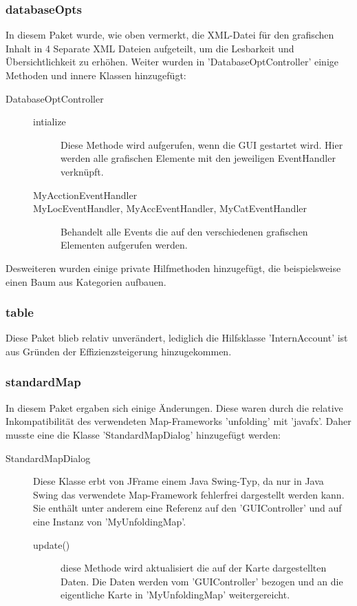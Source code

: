 		\subsubsection{databaseOpts}
		In diesem Paket wurde, wie oben vermerkt, die XML-Datei für den grafischen Inhalt in 4 Separate XML Dateien aufgeteilt, um die Lesbarkeit und Übersichtlichkeit zu erhöhen.
		Weiter wurden in 'DatabaseOptController' einige Methoden und innere Klassen hinzugefügt:
		\begin{description}
			\item[DatabaseOptController] \quad
			
			\begin{description}
				\item[intialize]
				 \quad
				Diese Methode wird aufgerufen, wenn die GUI gestartet wird. Hier werden alle grafischen Elemente mit den jeweiligen EventHandler verknüpft.
				\item[MyAcctionEventHandler]
				\item[MyLocEventHandler, MyAccEventHandler, MyCatEventHandler] 
				\quad
				Behandelt alle Events die auf den verschiedenen grafischen Elementen aufgerufen werden.
			\end{description}
		\end{description}
	
		Desweiteren wurden einige private Hilfmethoden hinzugefügt, die beispielsweise einen Baum aus Kategorien aufbauen.
		
		\subsubsection{table}
		
		Diese Paket blieb relativ unverändert, lediglich die Hilfsklasse 'InternAccount' ist aus Gründen der Effizienzsteigerung hinzugekommen.
		
		\subsubsection{standardMap}
		
		In diesem Paket ergaben sich einige Änderungen. Diese waren durch die relative Inkompatibilität des verwendeten Map-Frameworks 'unfolding' mit 'javafx'. Daher musste eine die Klasse 'StandardMapDialog' hinzugefügt werden:
		\begin{description}
			\item[StandardMapDialog] \quad Diese Klasse erbt von JFrame einem Java Swing-Typ, da nur in Java Swing das verwendete Map-Framework fehlerfrei dargestellt werden kann. Sie enthält unter anderem eine Referenz auf den 'GUIController' und auf eine Instanz von 'MyUnfoldingMap'.
			\begin{description}
				\item[update()] diese Methode wird aktualisiert die auf der Karte dargestellten Daten. Die Daten werden vom 'GUIController' bezogen und an die eigentliche Karte in 'MyUnfoldingMap' weitergereicht.
			\end{description}
		\end{description}
		

